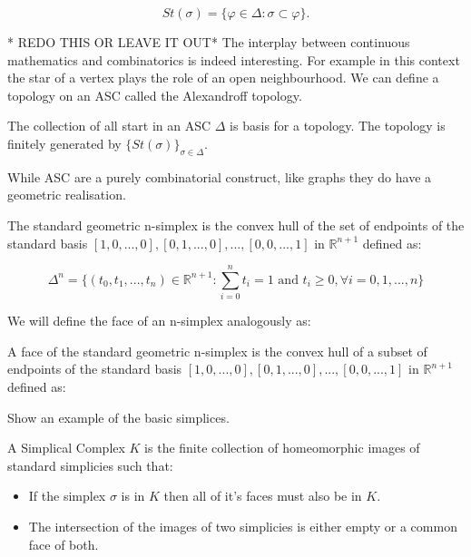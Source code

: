 $$ St(\sigma) =  \{ \varphi \in \Delta : \sigma \subset \varphi \}. $$


* REDO THIS OR LEAVE IT OUT*
The interplay between continuous mathematics and combinatorics is indeed interesting. For example in this context the star of a vertex plays the role of an open neighbourhood. We can define a topology on an ASC called the Alexandroff topology.


\begin{defn} The collection of all start in an ASC $\Delta$ is basis for a topology. The topology is finitely generated by $\{St(\sigma)\}_{\sigma \in \Delta}$.  \end{defn}




While ASC are a purely combinatorial construct, like graphs they do have a geometric realisation.

\begin{defn} The standard geometric n-simplex is the convex hull of the set of endpoints of the standard basis $[1, 0, ..., 0], [0, 1, ..., 0], ..., [0, 0, ..., 1]$ in $\mathbb{R}^{n+1}$ defined as: \end{defn}


$$ \Delta^n = \{(t_0, t_1, ..., t_n) \in \mathbb{R}^{n+1} : \sum_{i = 0}^{n} t_i  = 1 \text{ and } t_i \ge 0, \forall i = 0, 1, ..., n \} $$

We will define the face of an n-simplex analogously as:

\begin{defn} A face of the standard geometric n-simplex is the convex hull of a subset of endpoints of the standard basis $[1, 0, ..., 0], [0, 1, ..., 0], ..., [0, 0, ..., 1]$ in $\mathbb{R}^{n+1}$ defined as: \end{defn}

\begin{ex} Show an example of the basic simplices. \end{ex}

A Simplical Complex $K$ is the finite collection of homeomorphic images of standard simplicies such that:

\begin{itemize}
    \item If the simplex $\sigma$ is in $K$ then all of it's faces must also be in $K$.
    \item The intersection of the images of two simplicies is either empty or a common face of both.
\end{itemize}

